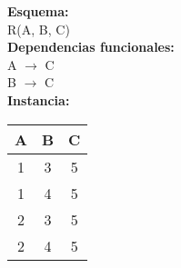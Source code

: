 \documentclass[preview]{standalone}
\begin{document}
\textbf{Esquema:}\\
R(A, B, C)\\

\textbf{Dependencias funcionales:}\\
A $\rightarrow$ C\\
B $\rightarrow$ C\\

\textbf{Instancia:}\\
\begin{center}
\begin{tabular}{ | c | c | c |}
  \hline			
  A & B & C \\
  \hline			
  1 & 3 & 5 \\
  1 & 4 & 5 \\
  2 & 3 & 5 \\
  2 & 4 & 5 \\
  \hline  
\end{tabular}
\end{center}
\end{document}
